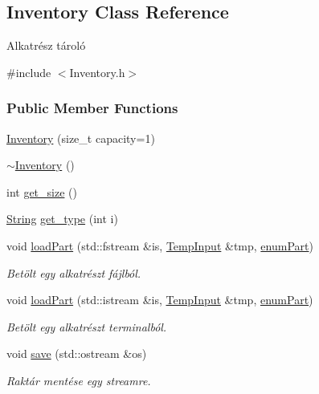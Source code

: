 \subsection{Inventory Class Reference}
\label{class_inventory}


Alkatrész tároló  




{\ttfamily \#include $<$Inventory.\+h$>$}

\subsubsection*{Public Member Functions}
\begin{DoxyCompactItemize}
\item 
\mbox{\hyperlink{class_inventory_af2c8bea3c8fbf97fec4d3f5ffb92f347}{Inventory}} (size\+\_\+t capacity=1)
\item 
\mbox{\hyperlink{class_inventory_a6c6dfcb6d977c74a7abf46809e892e3d}{$\sim$\+Inventory}} ()
\item 
int \mbox{\hyperlink{class_inventory_a3ccacc9422b01b2c17836ca804bcaafc}{get\+\_\+size}} ()
\item 
\mbox{\hyperlink{class_string}{String}} \mbox{\hyperlink{class_inventory_a217895dbb60e3d7643c41fdeeb775bc9}{get\+\_\+type}} (int i)
\item 
void \mbox{\hyperlink{class_inventory_a78912f140decdd10037eb682cf295d72}{load\+Part}} (std\+::fstream \&is, \mbox{\hyperlink{struct_temp_input}{Temp\+Input}} \&tmp, \mbox{\hyperlink{_parts_8h_abddff37837f171d72a2e16a1448a3943}{enum\+Part}})
\begin{DoxyCompactList}\small\item\em Betölt egy alkatrészt fájlból. \end{DoxyCompactList}\item 
void \mbox{\hyperlink{class_inventory_a9dd64f268a7a5cca611b5f749ec33f96}{load\+Part}} (std\+::istream \&is, \mbox{\hyperlink{struct_temp_input}{Temp\+Input}} \&tmp, \mbox{\hyperlink{_parts_8h_abddff37837f171d72a2e16a1448a3943}{enum\+Part}})
\begin{DoxyCompactList}\small\item\em Betölt egy alkatrészt terminalból. \end{DoxyCompactList}\item 
void \mbox{\hyperlink{class_inventory_a243a3e96705999b3cf556e9626a96525}{save}} (std\+::ostream \&os)
\begin{DoxyCompactList}\small\item\em Raktár mentése egy streamre. \end{DoxyCompactList}\item 

\end{DoxyCompactItemize}
